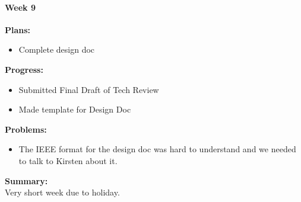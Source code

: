 \paragraph{Week 9}
\begin{adjustwidth}{2.5em}{0pt}
    \vspace{-0.5cm}\textbf{Plans:}
    \vspace{-0.5cm}
    \begin{itemize}
        \item Complete design doc
    \end{itemize} 
    \vspace{-0.3cm}\textbf{Progress:}
    \vspace{-0.5cm}
    \begin{itemize}
        \item Submitted Final Draft of Tech Review 
        \item Made template for Design Doc 
    \end{itemize} 
    \vspace{-0.3cm}\textbf{Problems:}
    \vspace{-0.5cm}
    \begin{itemize}
        \item The IEEE format for the design doc was hard to understand and we needed to talk to Kirsten about it. 
    \end{itemize}  
    \vspace{-0.3cm}\noindent\textbf{Summary:}\\
    \noindent Very short week due to holiday.
	\end{adjustwidth} 
